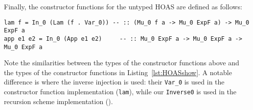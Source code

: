 Finally, the constructor functions for the untyped HOAS are defined as follows:
\begin{lstlisting}
lam f = In_0 (Lam (f . Var_0)) -- :: (Mu_0 f a -> Mu_0 ExpF a) -> Mu_0 ExpF a
app e1 e2 = In_0 (App e1 e2)     -- :: Mu_0 ExpF a -> Mu_0 ExpF a -> Mu_0 ExpF a
\end{lstlisting}
Note the similarities between the types of the constructor functions above
and the types of the constructor functions in Listing~\ref{lst:HOASshow}.
A notable difference is where the inverse injection is used:
their \lstinline{Var_0} is used in the constructor function implementation
(\lstinline{lam}), while our \lstinline{Inverse0} is used in
the recursion scheme implementation (\msfit{*}).
